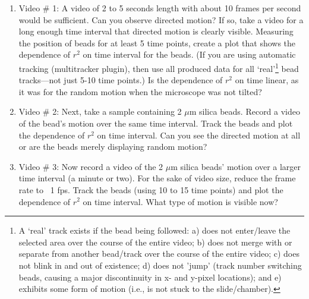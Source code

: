 \begin{enumerate}
\item Video \# 1: A video of 2 to 5 seconds length with about 10 frames per second would be sufficient. Can you observe directed motion? If so, take a video for a long enough time interval that directed motion is clearly visible. Measuring the position of beads for at least 5 time points, create a plot that shows the dependence of $r^{2}$ on time interval for the beads. (If you are using automatic tracking (multitracker plugin), then use all produced data for all `real'\footnote{
A `real' track exists if the bead being followed: a) does not enter/leave the selected area over the course of the entire video; b) does not merge with or separate from another bead/track over the course of the entire video; c) does not blink in and out of existence; d) does not 'jump' (track number switching beads, causing a major discontinuity in x- and y-pixel locations); and e) exhibits some form of motion (i.e., is not stuck to the slide/chamber).} 
bead tracks—not just 5-10 time points.) Is the dependence of $r^{2}$ on time linear, as it was for the random motion when the microscope was not tilted?
\item Video \# 2: Next, take a sample containing 2 $\mu$m silica beads. Record a video of the bead's motion over the same time interval. Track the beads and plot the dependence of $r^{2}$ on time interval. Can you see the directed motion at all or are the beads merely displaying random motion?
\item Video \# 3: Now record a video of the 2 $\mu$m silica beads' motion over a larger time interval (a minute or two). For the sake of video size, reduce the frame rate to ~1 fps. Track the beads (using 10 to 15 time points) and plot the dependence of $r^{2}$ on time interval. What type of motion is visible now?
\end{enumerate}
